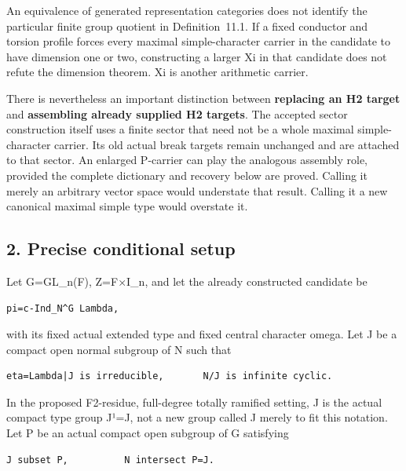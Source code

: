 An equivalence of generated representation categories does not identify
the particular finite group quotient in Definition~11.1. If a fixed
conductor and torsion profile forces every maximal simple-character
carrier in the candidate to have dimension one or two, constructing a
larger Xi in that candidate does not refute the dimension theorem. Xi is
another arithmetic carrier.

There is nevertheless an important distinction between \textbf{replacing
an H2 target} and \textbf{assembling already supplied H2 targets}. The
accepted sector construction itself uses a finite sector that need not
be a whole maximal simple-character carrier. Its old actual break
targets remain unchanged and are attached to that sector. An enlarged
P-carrier can play the analogous assembly role, provided the complete
dictionary and recovery below are proved. Calling it merely an arbitrary
vector space would understate that result. Calling it a new canonical maximal simple type would overstate it.

\hypertarget{lowrank_contract-precise-conditional-setup}{%
\subsection{2. Precise conditional
setup}\label{lowrank_contract-precise-conditional-setup}}

Let G=GL\_n(F), Z=F×I\_n, and let the already constructed candidate be

\begin{Verbatim}[fontsize=\small,breaklines=true,breakanywhere=true]
pi=c-Ind_N^G Lambda,
\end{Verbatim}

with its fixed actual extended type and fixed central character omega.
Let J be a compact open normal subgroup of N such that

\begin{Verbatim}[fontsize=\small,breaklines=true,breakanywhere=true]
eta=Lambda|J is irreducible,       N/J is infinite cyclic.
\end{Verbatim}

In the proposed F2-residue, full-degree totally ramified setting, J is
the actual compact type group J¹=J, not a new group called J merely to
fit this notation. Let P be an actual compact open subgroup of G
satisfying

\begin{Verbatim}[fontsize=\small,breaklines=true,breakanywhere=true]
J subset P,          N intersect P=J.
\end{Verbatim}

